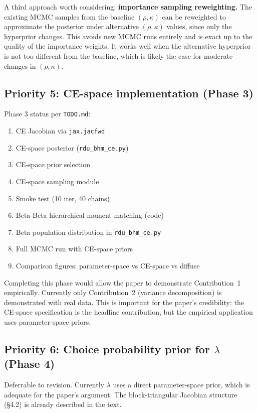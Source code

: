 \documentclass[12pt,a4paper]{article}
\begin{document}
A third approach worth considering: \textbf{importance sampling reweighting.}
The existing MCMC samples from the baseline $(\rho, \kappa)$ can be
reweighted to approximate the posterior under alternative $(\rho, \kappa)$
values, since only the hyperprior changes. This avoids new MCMC runs entirely
and is exact up to the quality of the importance weights. It works well when
the alternative hyperprior is not too different from the baseline, which is
likely the case for moderate changes in $(\rho, \kappa)$.


\subsection{Priority 5: CE-space implementation (Phase 3)}

Phase 3 status per \texttt{TODO.md}:

\begin{enumerate}
  \item[{[x]}] CE Jacobian via \texttt{jax.jacfwd}
  \item[{[x]}] CE-space posterior (\texttt{rdu\_bhm\_ce.py})
  \item[{[x]}] CE-space prior selection
  \item[{[x]}] CE-space sampling module
  \item[{[x]}] Smoke test (10 iter, 40 chains)
  \item[{[ ]}] Beta-Beta hierarchical moment-matching (code)
  \item[{[ ]}] Beta population distribution in \texttt{rdu\_bhm\_ce.py}
  \item[{[ ]}] Full MCMC run with CE-space priors
  \item[{[ ]}] Comparison figures: parameter-space vs CE-space vs diffuse
\end{enumerate}

Completing this phase would allow the paper to demonstrate Contribution~1
empirically. Currently only Contribution~2 (variance decomposition) is
demonstrated with real data. This is important for the paper's credibility:
the CE-space specification is the headline contribution, but the empirical
application uses parameter-space priors.


\subsection{Priority 6: Choice probability prior for $\lambda$ (Phase 4)}

Deferrable to revision. Currently $\lambda$ uses a direct parameter-space
prior, which is adequate for the paper's argument. The block-triangular
Jacobian structure (\S4.2) is already described in the text.
\end{document}
